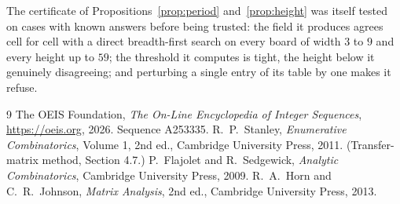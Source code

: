 \documentclass[11pt,a4paper]{article}
\theoremstyle{plain}
\theoremstyle{definition}
\begin{document}
The certificate of Propositions~\ref{prop:period} and~\ref{prop:height} was itself tested
on cases with known answers before being trusted: the field it produces agrees cell for cell
with a direct breadth-first search on every board of width $3$ to $9$ and every height up to
$59$; the threshold it computes is tight, the height below it genuinely disagreeing; and
perturbing a single entry of its table by one makes it refuse.

\begin{thebibliography}{9}
 The OEIS Foundation, \emph{The On-Line Encyclopedia of Integer
Sequences}, \url{https://oeis.org}, 2026. Sequence A253335.
 R.~P.~Stanley, \emph{Enumerative Combinatorics}, Volume 1, 2nd ed.,
Cambridge University Press, 2011. (Transfer-matrix method, Section 4.7.)
 P.~Flajolet and R.~Sedgewick, \emph{Analytic Combinatorics}, Cambridge
University Press, 2009.
 R.~A.~Horn and C.~R.~Johnson, \emph{Matrix Analysis}, 2nd ed., Cambridge
University Press, 2013.
\end{thebibliography}
\end{document}

